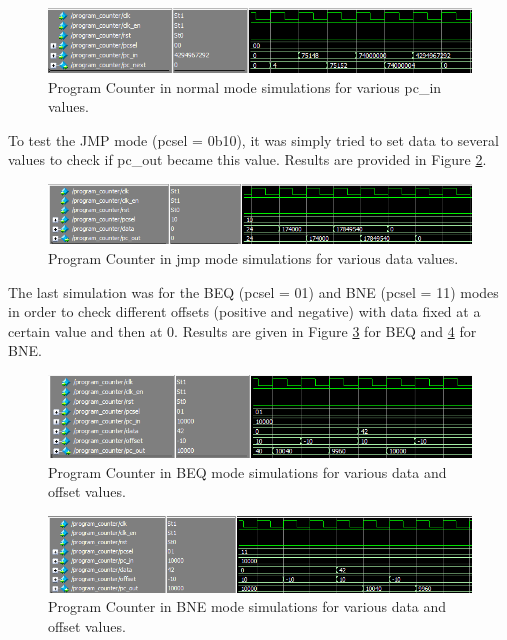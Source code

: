 \begin{figure}[H]
    \centering
    \includegraphics[width=\linewidth]{Chapter3-CPU/res/pc_simu_00.PNG}
    \caption{Program Counter in normal mode simulations for various pc\_in values.}
    \label{fig:sim/pc_00}
\end{figure}

To test the JMP mode (pcsel = 0b10), it was simply tried to set data to several values to check if 
pc\_out became this value. Results are provided in Figure \ref{fig:sim/pc_10}.

\begin{figure}[H]
    \centering
    \includegraphics[width=\linewidth]{Chapter3-CPU/res/pc_simu_10.PNG}
    \caption{Program Counter in jmp mode simulations for various data values.}
    \label{fig:sim/pc_10}
\end{figure}

The last simulation was for the BEQ (pcsel = 01) and BNE (pcsel = 11) modes in order to check 
different offsets (positive and negative) with data fixed at a certain value and then at 0.
Results are given in Figure \ref{fig:sim/pc_01} for BEQ and \ref{fig:sim/pc_11} for BNE.

\begin{figure}[H]
    \centering
    \includegraphics[width=\linewidth]{Chapter3-CPU/res/pc_simu_01.PNG}
    \caption{Program Counter in BEQ mode simulations for various data and offset values.}
    \label{fig:sim/pc_01}
\end{figure}

\begin{figure}[H]
    \centering
    \includegraphics[width=\linewidth]{Chapter3-CPU/res/pc_simu_11.PNG}
    \caption{Program Counter in BNE mode simulations for various data and offset values.}
    \label{fig:sim/pc_11}
\end{figure}

